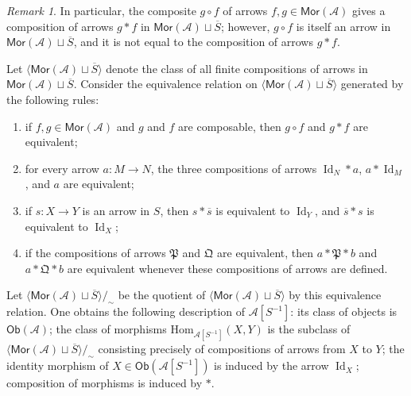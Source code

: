 \documentclass[10pt,a4paper]{amsart}
\theoremstyle{plain}
\theoremstyle{definition}
\theoremstyle{remark}
\newtheorem{remark}[theorem]{Remark}
\begin{document}
\begin{remark}
  In particular, the composite $g \circ f$ of arrows $f,g\in\mathsf{Mor}(\mathcal A)$ gives a composition of arrows $g \ast f$ in $\mathsf{Mor} (\mathcal{A}) \sqcup \overline S$; however, $g \circ f$ is itself an arrow in $\mathsf{Mor} (\mathcal{A}) \sqcup \overline S$, and it is not equal to the composition of arrows $g \ast f$.
\end{remark}
\noindent Let $\langle \mathsf{Mor} (\mathcal{A}) \sqcup \overline S \rangle$ denote the class of all finite compositions of arrows in $\mathsf{Mor} (\mathcal{A}) \sqcup \overline S$.
Consider the equivalence relation on $\langle \mathsf{Mor} (\mathcal{A}) \sqcup \overline S \rangle$ generated by the following rules:
\begin{enumerate}[label=\textup{(\arabic*)}]
  \item if $f,g \in \mathsf{Mor}(\mathcal{A})$ and $g$ and $f$ are composable, then $g \circ f$ and $g \ast f$ are equivalent;
  \item for every arrow $a : M \longrightarrow N$, the three compositions of arrows $\operatorname{Id}_N \ast a$, $a \ast \operatorname{Id}_M$, and $a$ are equivalent;
  \item if $s : X \longrightarrow Y$ is an arrow in $S$, then $s \ast \overline s$ is equivalent to $\operatorname{Id}_Y$, and $\overline s \ast s$ is equivalent to $\operatorname{Id}_X$;
  \item if the compositions of arrows $\mathfrak P$ and $\mathfrak Q$ are equivalent, then $a \ast \mathfrak P \ast b$ and $a \ast \mathfrak Q \ast b$ are equivalent whenever these compositions of arrows are defined.
\end{enumerate}

\medskip

Let $\langle \mathsf{Mor} (\mathcal{A}) \sqcup \overline S \rangle /_\sim$ be the quotient of $\langle \mathsf{Mor} (\mathcal{A}) \sqcup \overline S \rangle$ by this equivalence relation.
One obtains the following description of $\mathcal{A}[S^{-1}]$: its class of objects is $\mathsf{Ob}(\mathcal{A})$; the class of morphisms $\mathrm{Hom}_{\mathcal{A}[S^{-1}]}(X, Y)$ is the subclass of $\langle \mathsf{Mor} (\mathcal{A}) \sqcup \overline S \rangle/_\sim$ consisting precisely of compositions of arrows from $X$ to $Y$; the identity morphism of $X \in \mathsf{Ob}(\mathcal{A}[S^{-1}])$ is induced by the arrow $\operatorname{Id}_X$; composition of morphisms is induced by $\ast$.

\medskip
\end{document}
